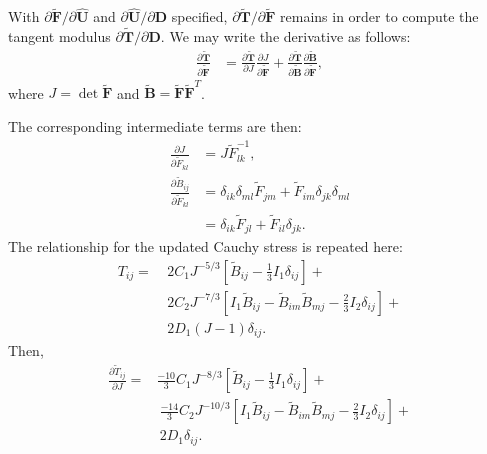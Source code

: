 With $\partial \tilde{\bm F}/\partial \hat{\bm U}$ and $\partial \hat{\bm U}/\partial {\bm D}$ specified, $\partial \tilde{\bm T}/\partial \tilde {\bm F}$ remains in order to compute the tangent modulus $\partial \tilde{\bm T}/\partial {\bm D}$. We may write the derivative as follows:
\begin{align}
\frac{\partial \tilde{\bm T}}{\partial \tilde{\bm F}} &= \frac{\partial \tilde{\bm T}}{\partial J}\frac{\partial J}{\partial \tilde {\bm F}} + \frac{\partial \tilde{\bm T}}{\partial {\tilde{\bm {B}}}}\frac{\partial {\tilde{\bm {B}}}}{\partial \tilde {\bm F}},
\end{align}
where $J = \det\tilde{\bm{F}}$ and $\tilde{\bm{B}} = \tilde{\bm{F}}\tilde{\bm{F}}^T$.

The corresponding intermediate terms are then:
\begin{align}
\frac{\partial J}{\partial {\tilde{F}}_{kl}} &= {J}{\tilde{F}}^{-1}_{lk}, \\
\frac{\partial \tilde{B}_{ij}}{\partial {\tilde{F}}_{kl}} &= \delta_{ik}\delta_{ml}{\tilde{F}}_{jm} + {\tilde{F}}_{im}\delta_{jk}\delta_{ml} \\
 &=  \delta_{ik}{\tilde{F}}_{jl} + {\tilde{F}}_{il}\delta_{jk}.
\end{align}
The relationship for the updated Cauchy stress is repeated here:
\begin{equation}
\begin{aligned}
T_{ij} = &\ 2C_1J^{-5/3}\left[\tilde{B}_{ij} - \frac{1}{3}I_1\delta_{ij}\right] + \\ 
&\ 2C_2J^{-7/3}\left[I_1\tilde{B}_{ij} - \tilde{B}_{im}\tilde{B}_{mj} - \frac{2}{3}I_2\delta_{ij}\right] + \\
&\ 2D_1(J-1)\delta_{ij}.
\end{aligned}
\end{equation}
Then,
\begin{equation}
\begin{aligned}
\frac{\partial \tilde{T}_{ij}}{\partial J} = &\frac{-10}{3}C_1J^{-8/3}\left[\tilde{B}_{ij} - \frac{1}{3}I_1\delta_{ij}\right] + \\
&\ \frac{-14}{3}C_2J^{-10/3}\left[I_1\tilde{B}_{ij} - \tilde{B}_{im}\tilde{B}_{mj} - \frac{2}{3}I_2\delta_{ij}\right] + \\ &\ 2D_1\delta_{ij}.
\end{aligned}
\end{equation}

